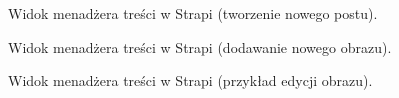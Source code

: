 \documentclass[a4paper, 12pt]{article}
\numberwithin{figure}{section}
\begin{document}
\begin{sloppypar}
\begin{figure}[H] 
    \centering
   \caption{Widok menadżera treści w Strapi (tworzenie nowego postu).}
   \label{fig:strapi-use-3.jpg}
\end{figure}

\begin{figure}[H] 
    \centering
   \caption{Widok menadżera treści w Strapi (dodawanie nowego obrazu).}
   \label{fig:strapi-use-4.jpg}
\end{figure}

\begin{figure}[H] 
    \centering
   \caption{Widok menadżera treści w Strapi (przykład edycji obrazu).}
   \label{fig:strapi-use-5.jpg}
\end{figure}


\end{sloppypar}
\end{document}
